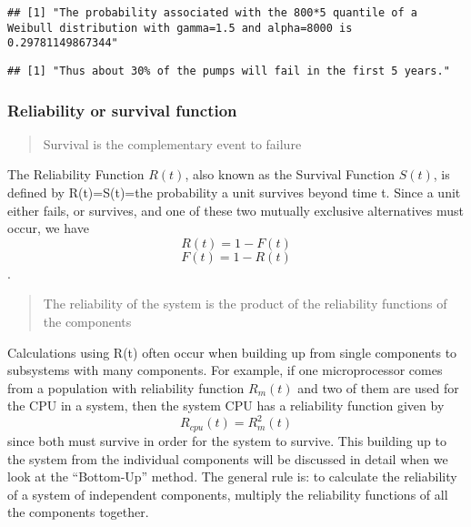 \documentclass[]{book}
\newenvironment{Shaded}{\begin{snugshade}}{\end{snugshade}}
\newcommand{\KeywordTok}[1]{\textcolor[rgb]{0.13,0.29,0.53}{\textbf{#1}}}
\newcommand{\DataTypeTok}[1]{\textcolor[rgb]{0.13,0.29,0.53}{#1}}
\newcommand{\DecValTok}[1]{\textcolor[rgb]{0.00,0.00,0.81}{#1}}
\newcommand{\FloatTok}[1]{\textcolor[rgb]{0.00,0.00,0.81}{#1}}
\newcommand{\StringTok}[1]{\textcolor[rgb]{0.31,0.60,0.02}{#1}}
\newcommand{\OperatorTok}[1]{\textcolor[rgb]{0.81,0.36,0.00}{\textbf{#1}}}
\newcommand{\NormalTok}[1]{#1}
\theoremstyle{definition}
\theoremstyle{definition}
\theoremstyle{definition}
\theoremstyle{remark}
\begin{document}
\begin{verbatim}
## [1] "The probability associated with the 800*5 quantile of a Weibull distribution with gamma=1.5 and alpha=8000 is 0.29781149867344"
\end{verbatim}

\begin{Shaded}
\end{Shaded}

\begin{verbatim}
## [1] "Thus about 30% of the pumps will fail in the first 5 years."
\end{verbatim}

\subsubsection{Reliability or survival
function}\label{reliability-or-survival-function}

\begin{quote}
Survival is the complementary event to failure
\end{quote}

The Reliability Function \(R(t)\), also known as the Survival Function
\(S(t)\), is defined by R(t)=S(t)=the probability a unit survives beyond
time t. Since a unit either fails, or survives, and one of these two
mutually exclusive alternatives must occur, we have \[R(t)=1−F(t)\]
\[F(t)=1−R(t)\].

\begin{quote}
The reliability of the system is the product of the reliability
functions of the components
\end{quote}

Calculations using R(t) often occur when building up from single
components to subsystems with many components. For example, if one
microprocessor comes from a population with reliability function
\(R_{m}(t)\) and two of them are used for the CPU in a system, then the
system CPU has a reliability function given by \[R_{cpu}(t) = R_m^2(t)\]
since both must survive in order for the system to survive. This
building up to the system from the individual components will be
discussed in detail when we look at the ``Bottom-Up'' method. The
general rule is: to calculate the reliability of a system of independent
components, multiply the reliability functions of all the components
together.
\end{document}
